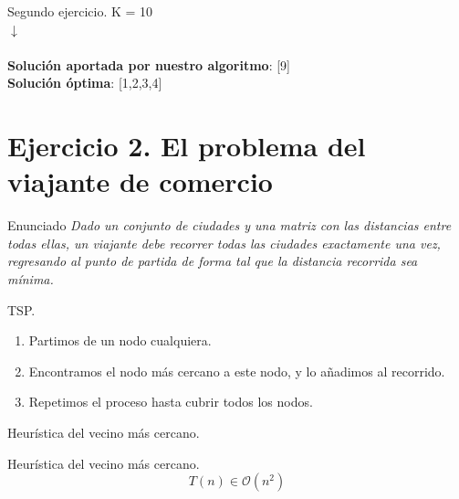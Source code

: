 \documentclass[10pt, xcolor=table]{beamer}
\begin{document}
\begin{frame}[fragile]{Segundo ejercicio. }
	\centering [5, 4, 6, 1, 1, 2, 7, 9, 8, 3] \hspace{0.2cm}K = 10
	\\
	\centering $\downarrow$
	\\
	\centering [9, 8, 7, 6, 5, 4, 3, 2, 1, 1]
	\\
	\textbf{Solución aportada por nuestro algoritmo}: [9]
	\\
	\textbf{Solución óptima}: [1,2,3,4]
	
\end{frame}

\section{Ejercicio 2. El problema del viajante de comercio}

\begin{frame}[fragile]{Enunciado}
\textit{Dado un conjunto de ciudades y una matriz con las distancias entre todas ellas, un viajante debe recorrer todas las ciudades exactamente una vez, regresando al punto de partida de forma tal que la distancia recorrida sea mínima.}
\end{frame}

\begin{frame}[fragile]{TSP. }
\begin{enumerate}
	\item Partimos de un nodo cualquiera.
	\item Encontramos el nodo más cercano a este nodo, y lo añadimos al recorrido.
	\item Repetimos el proceso hasta cubrir todos los nodos.
\end{enumerate}
\end{frame}

\begin{frame}[fragile]{Heurística del vecino más cercano. }
\begin{center}
\scalebox{0.75}{

}
\end{center}
\end{frame}

\begin{frame}[fragile]{Heurística del vecino más cercano. }
\[
	T(n) \in \mathcal{O} (n^2)
\]
\end{frame}
\end{document}
